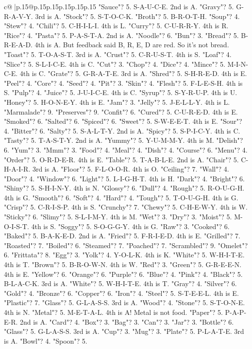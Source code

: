 \documentclass{article}
\begin{document}
{\begin{supertabular}{c@{$\;$}|p{.15\linewidth}@{}p{.15\linewidth}p{.15\linewidth}p{.15\linewidth}p{.15\linewidth}p{.15\linewidth}}
{{{"Sauce"? 5. S{-}A{-}U{-}C{-}E. 2nd is A. "Gravy"? 5. G{-}R{-}A{-}V{-}Y. 3rd is A. "Stock"? 5. S{-}T{-}O{-}C{-}K. "Broth"? 5. B{-}R{-}O{-}T{-}H. "Soup"? 4. "Stew"? 4. "Chili"? 5. C{-}H{-}I{-}L{-}I. 4th is L. "Curry"? 5. C{-}U{-}R{-}R{-}Y. 4th is R. "Rice"? 4. "Pasta"? 5. P{-}A{-}S{-}T{-}A. 2nd is A. "Noodle"? 6. "Bun"? 3. "Bread"? 5. B{-}R{-}E{-}A{-}D. 4th is A. But feedback said B, R, E, D are red. So it's not bread. "Toast"? 5. T{-}O{-}A{-}S{-}T. 3rd is A. "Crust"? 5. C{-}R{-}U{-}S{-}T. 4th is S. "Loaf"? 4. "Slice"? 5. S{-}L{-}I{-}C{-}E. 4th is C. "Cut"? 3. "Chop"? 4. "Dice"? 4. "Mince"? 5. M{-}I{-}N{-}C{-}E. 4th is C. "Grate"? 5. G{-}R{-}A{-}T{-}E. 3rd is A. "Shred"? 5. S{-}H{-}R{-}E{-}D. 4th is E. "Peel"? 4. "Core"? 4. "Seed"? 4. "Pit"? 3. "Skin"? 4. "Flesh"? 5. F{-}L{-}E{-}S{-}H. 4th is S. "Pulp"? 4. "Juice"? 5. J{-}U{-}I{-}C{-}E. 4th is C. "Syrup"? 5. S{-}Y{-}R{-}U{-}P. 4th is U. "Honey"? 5. H{-}O{-}N{-}E{-}Y. 4th is E. "Jam"? 3. "Jelly"? 5. J{-}E{-}L{-}L{-}Y. 4th is L. "Marmalade"? 9. "Preserves"? 9. "Confit"? 6. "Cured"? 5. C{-}U{-}R{-}E{-}D. 4th is E. "Smoked"? 6. "Salted"? 6. "Spiced"? 6. "Sweet"? 5. S{-}W{-}E{-}E{-}T. 4th is E. "Sour"? 4. "Bitter"? 6. "Salty"? 5. S{-}A{-}L{-}T{-}Y. 2nd is A. "Spicy"? 5. S{-}P{-}I{-}C{-}Y. 4th is C. "Tasty"? 5. T{-}A{-}S{-}T{-}Y. 2nd is A. "Yummy"? 5. Y{-}U{-}M{-}M{-}Y. 4th is M. "Delish"? 6. "Yum"? 3. "Mmm"? 3. "Food"? 4. "Meal"? 4. "Dish"? 4. "Course"? 6. "Menu"? 4. "Order"? 5. O{-}R{-}D{-}E{-}R. 4th is E. "Table"? 5. T{-}A{-}B{-}L{-}E. 2nd is A. "Chair"? 5. C{-}H{-}A{-}I{-}R. 3rd is A. "Floor"? 5. F{-}L{-}O{-}O{-}R. 4th is O. "Ceiling"? 7. "Wall"? 4. "Door"? 4. "Window"? 6. "Light"? 5. L{-}I{-}G{-}H{-}T. 4th is H. "Dark"? 4. "Bright"? 6. "Shiny"? 5. S{-}H{-}I{-}N{-}Y. 4th is N. "Glossy"? 6. "Dull"? 4. "Rough"? 5. R{-}O{-}U{-}G{-}H. 4th is G. "Smooth"? 6. "Soft"? 4. "Hard"? 4. "Tough"? 5. T{-}O{-}U{-}G{-}H. 4th is G. "Crisp"? 5. C{-}R{-}I{-}S{-}P. 4th is S. "Crunchy"? 7. "Chewy"? 5. C{-}H{-}E{-}W{-}Y. 4th is W. "Sticky"? 6. "Slimy"? 5. S{-}L{-}I{-}M{-}Y. 4th is M. "Wet"? 3. "Dry"? 3. "Moist"? 5. M{-}O{-}I{-}S{-}T. 4th is S. "Soggy"? 5. S{-}O{-}G{-}G{-}Y. 4th is G. "Raw"? 3. "Cooked"? 6. "Baked"? 5. B{-}A{-}K{-}E{-}D. 2nd is A. "Fried"? 5. F{-}R{-}I{-}E{-}D. 4th is E. "Grilled"? 7. "Roasted"? 7. "Boiled"? 6. "Steamed"? 7. "Poached"? 7. "Scrambled"? 9. "Omelet"? 6. "Frittata"? 8. "Egg"? 3. "Yolk"? 4. Y{-}O{-}L{-}K. 4th is K. "White"? 5. W{-}H{-}I{-}T{-}E. 4th is T. "Brown"? 5. B{-}R{-}O{-}W{-}N. 4th is W. "Red"? 3. "Green"? 5. G{-}R{-}E{-}E{-}N. 4th is E. "Yellow"? 6. "Orange"? 6. "Purple"? 6. "Blue"? 4. "Pink"? 4. "Black"? 5. B{-}L{-}A{-}C{-}K. 3rd is A. "White"? 5. W{-}H{-}I{-}T{-}E. 4th is T. "Gray"? 4. "Silver"? 6. "Gold"? 4. "Bronze"? 6. "Copper"? 6. "Iron"? 4. "Steel"? 5. S{-}T{-}E{-}E{-}L. 4th is E. "Plastic"? 7. "Glass"? 5. G{-}L{-}A{-}S{-}S. 3rd is A. "Wood"? 4. "Stone"? 5. S{-}T{-}O{-}N{-}E. 4th is N. "Metal"? 5. M{-}E{-}T{-}A{-}L. 4th is A! Metal is not food. "Paper"? 5. P{-}A{-}P{-}E{-}R. 2nd is A. "Card"? 4. "Box"? 3. "Bag"? 3. "Can"? 3. "Jar"? 3. "Bottle"? 6. "Glass"? 5. G{-}L{-}A{-}S{-}S. 3rd is A. "Cup"? 3. "Mug"? 3. "Plate"? 5. P{-}L{-}A{-}T{-}E. 3rd is A. "Bowl"? 4. "Spoon"? 5. }}}
\end{supertabular}}
\end{document}
